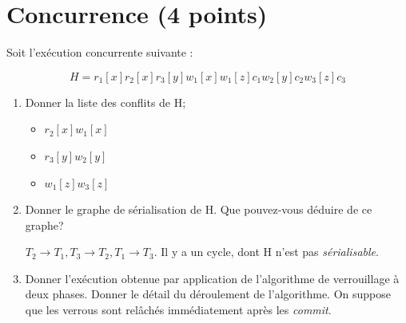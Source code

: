 \section{Concurrence (4 points)}

Soit l'exécution concurrente suivante :

$$H = r_1[x] r_2[x] r_3[y] w_1[x] w_1[z] c_1 w_2[y] c_2 w_3[z] c_3$$

\begin{enumerate}

\item Donner la liste des conflits de H; 
\begin{solution}
    \begin{itemize}
        \item[sur x : ] $r_2[x] w_1[x]$
        \item[sur y : ] $r_3[y] w_2[y]$
        \item[sur z : ] $w_1[z] w_3[z]$
    \end{itemize}
\end{solution}

\item Donner le graphe de s\'erialisation de H. Que pouvez-vous déduire de ce graphe?
\begin{solution}
    $T_2 \rightarrow T_1, T_3 \rightarrow T_2, T_1 \rightarrow T_3$. Il y a un cycle, dont H n'est pas \textit{s\'erialisable}.
\end{solution}


\item Donner l'exécution obtenue par application de l'algorithme de verrouillage \`a deux phases. 
Donner le d\'etail du d\'eroulement de l'algorithme. On suppose que les verrous sont rel\^ach\'es imm\'ediatement apr\`es les {\it commit}. 

\end{enumerate}
